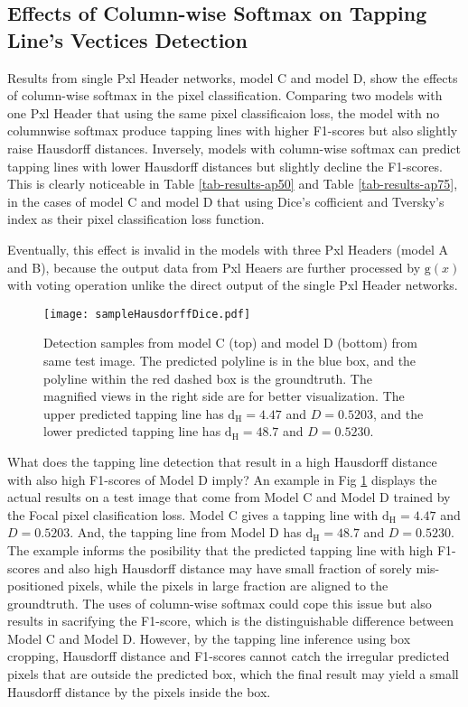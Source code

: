 \documentclass[default,pdflatex,iicol]{sn-jnl}%
\begin{document}
\subsection{Effects of Column-wise Softmax on Tapping Line's Vectices Detection}
Results from single Pxl Header networks, model C and model D, show the effects of column-wise softmax in the pixel classification. Comparing two models with one Pxl Header that using the same pixel classificaion loss, the model with no columnwise softmax produce tapping lines with higher F1-scores but also slightly raise Hausdorff distances. Inversely, models with column-wise softmax can predict tapping lines with lower Hausdorff distances but slightly decline the F1-scores. This is clearly noticeable in Table \ref{tab-results-ap50} and Table \ref{tab-results-ap75}, in the cases of model C and model D that using Dice's cofficient and Tversky's index as their pixel classification loss function.

Eventually, this effect is invalid in the models with three Pxl Headers (model A and B), because the output data from Pxl Heaers are further processed by $\mathrm{g}(x)$ with voting operation unlike the direct output of the single Pxl Header networks.

\begin{figure}[!h]%
\centering
\texttt{[image: sampleHausdorffDice.pdf]}
\caption{Detection samples from model C (top) and model D (bottom) from same test image. The predicted polyline is in the blue box, and the polyline within the red dashed box is the groundtruth. The magnified views in the right side are for better visualization. The upper predicted tapping line has $\mathrm{d_{H}}=4.47$ and $D=0.5203$, and the lower predicted tapping line has $\mathrm{d_{H}}=48.7$ and $D=0.5230$.}\label{fig-sampleHausdorffDice}
\end{figure}

What does the tapping line detection that result in a high Hausdorff distance with also high F1-scores of Model D imply? An example in Fig \ref{fig-sampleHausdorffDice} displays the actual results on a test image that come from Model C and Model D trained by the Focal pixel clasification loss. Model C gives a tapping line with $\mathrm{d_{H}}=4.47$ and $D=0.5203$. And, the tapping line from Model D has $\mathrm{d_{H}}=48.7$ and $D=0.5230$. The example informs the posibility that the predicted tapping line with high F1-scores and also high Hausdorff distance may have small fraction of sorely mis-positioned pixels, while the pixels in large fraction are aligned to the groundtruth. The uses of column-wise softmax could cope this issue but also results in sacrifying the F1-score, which is the distinguishable difference between Model C and Model D. However, by the tapping line inference using box cropping, Hausdorff distance and F1-scores cannot catch the irregular predicted pixels that are outside the predicted box, which the final result may yield a small Hausdorff distance by the pixels inside the box.
\end{document}
